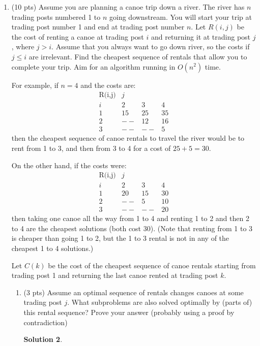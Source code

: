 \documentclass[11pt]{article}
\newtheorem*{solution}{Solution}
\begin{document}
\begin{enumerate}
\begin{enumerate}
\begin{solution}
\end{solution}
\end{enumerate}

(optional challenge for the interested students, not to be turned in: solve the variant of the problem 
where the handyman can be used at cost $h$ to finish the last one, two, or three tasks on the list) 
\newpage

 \item (10 pts) Assume you are planning a canoe trip down a river.
The river has $n$ trading posts numbered 1 to $n$ going downstream.
You will start your trip at trading post number 1 and end at trading 
post number $n$.  
Let $R(i,j)$ be the cost of renting a canoe at trading post
$i$ and returning it at trading post $j$, where $j> i$.
Assume that you always want to go down river, so the costs if $j\leq i$ 
are irrelevant.  Find the cheapest sequence of rentals that 
allow you to complete your trip.
Aim for an algorithm running in $O(n^2)$ time.

For example, if $n=4$ and the costs are:
\[
\begin{array}{lccc} 
\mbox{R(i,j)} &  {j}  \\ 
{i} &   2 &   3 &   4 \\ \hline
1   &  15 &  25 &  35 \\
2   &  -- &  12 &  16 \\
3   &  -- & -- & 5
\end{array}
\]
then the cheapest sequence of canoe rentals to travel the river
would be to rent from 1 to 3, and then from 3 to 4 for a cost of $25+5=30$.

On the other hand, if the costs were:
\[
\begin{array}{lccc} 
\mbox{R(i,j)} & {j}  \\
{i} &   2 &   3 &   4 \\ \hline
1   &  20 &  15 &  30 \\
2   &  -- &  5 &  10 \\
3   &  -- & -- & 20
\end{array}
\]
then taking one canoe all the way from 1 to 4 and 
renting 1 to 2 and then 2 to 4 are the cheapest solutions (both cost 30). 
(Note that renting from 1 to 3 is cheaper than going 1 to 2, but the 
1 to 3 rental is not in any of the cheapest 1 to 4 solutions.)

Let $C(k)$ be the cost of the cheapest sequence of canoe rentals starting
from trading post 1 and returning the last canoe rented at trading post $k$.
\newpage
\begin{enumerate}
\item (3 pts)  Assume an optimal sequence of rentals changes canoes at
some trading post $j$.  What subproblems are also solved optimally
by (parts of) this rental sequence?  Prove your answer (probably using a proof by contradiction)
\begin{solution}


\end{solution}
\end{enumerate}
\end{enumerate}
\end{document}
